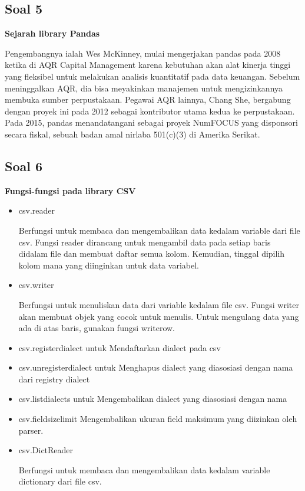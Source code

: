 \subsection{Soal 5}

\textbf{Sejarah library Pandas}

Pengembangnya ialah Wes McKinney, mulai mengerjakan pandas pada 2008 ketika di AQR Capital Management karena kebutuhan akan alat kinerja tinggi yang fleksibel untuk melakukan analisis kuantitatif pada data keuangan. Sebelum meninggalkan AQR, dia bisa meyakinkan manajemen untuk mengizinkannya membuka sumber perpustakaan. Pegawai AQR lainnya, Chang She, bergabung dengan proyek ini pada 2012 sebagai kontributor utama kedua ke perpustakaan. Pada 2015, pandas menandatangani sebagai proyek NumFOCUS yang disponsori secara fiskal, sebuah badan amal nirlaba 501(c)(3) di Amerika Serikat.

\subsection{Soal 6}

\textbf{Fungsi-fungsi pada library CSV}

\begin{itemize}
\item csv.reader

Berfungsi untuk membaca dan mengembalikan data kedalam variable dari file csv.	Fungsi 	reader dirancang untuk mengambil data pada setiap baris didalam file dan membuat daftar semua 	kolom. Kemudian, tinggal dipilih kolom mana yang diinginkan untuk data variabel.


\item csv.writer

Berfungsi untuk menuliskan data dari variable kedalam file csv. Fungsi writer akan membuat objek yang cocok untuk menulis. Untuk mengulang data yang ada di atas baris, gunakan fungsi writerow.

	
\item csv.register\textunderscore dialect untuk Mendaftarkan dialect pada csv
\item csv.unregister\textunderscore dialect untuk Menghapus dialect yang diasosiasi dengan nama dari registry dialect
\item csv.list\textunderscore dialects untuk Mengembalikan dialect yang diasosiasi dengan nama
\item csv.field\textunderscore size\textunderscore limit Mengembalikan ukuran field maksimum yang diizinkan oleh parser.
\item csv.DictReader

Berfungsi untuk membaca dan mengembalikan data kedalam variable dictionary dari file csv.

\end{itemize}

